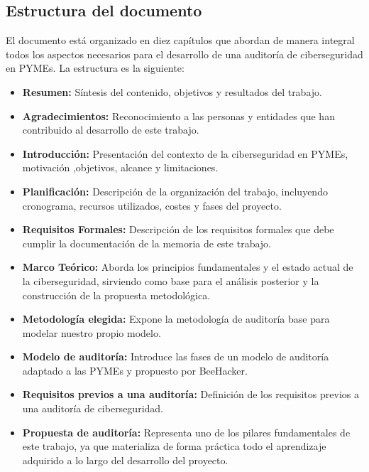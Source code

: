 \documentclass[a4paper, 11pt]{article}
\begin{document}
\subsection{Estructura del documento}


El documento está organizado en diez capítulos que abordan de manera integral todos los aspectos necesarios para el desarrollo de una auditoría de ciberseguridad en PYMEs. La estructura es la siguiente:

\begin{itemize}

    \item \textbf{Resumen:} Síntesis del contenido, objetivos y resultados del trabajo.

    \item \textbf{Agradecimientos:} Reconocimiento a las personas y entidades que han contribuido al desarrollo de este trabajo.
        
    \item \textbf{Introducción:} Presentación del contexto de la ciberseguridad en PYMEs, motivación ,objetivos, alcance y limitaciones.
    
    \item \textbf{Planificación:} Descripción de la organización del trabajo, incluyendo cronograma, recursos utilizados, costes y fases del proyecto.
    
    \item \textbf{Requisitos Formales:} Descripción de los requisitos formales que debe cumplir la documentación de la memoria de este trabajo.
    
    \item \textbf{Marco Teórico:} Aborda los principios fundamentales y el estado actual de la ciberseguridad, sirviendo como base para el análisis posterior y la construcción de la propuesta metodológica.
    
    \item \textbf{Metodología elegida:} Expone la metodología de auditoría base para modelar nuestro propio modelo.
    
    \item \textbf{Modelo de auditoría:} Introduce las fases de un modelo de auditoría adaptado a las PYMEs y propuesto por BeeHacker.
    
    \item \textbf{Requisitos previos a una auditoría:} Definición de los requisitos previos a una auditoría de ciberseguridad.
    
    \item \textbf{Propuesta de auditoría:} Representa uno de los pilares fundamentales de este trabajo, ya que materializa de forma práctica todo el aprendizaje adquirido a lo largo del desarrollo del proyecto.


\end{itemize}
\end{document}
